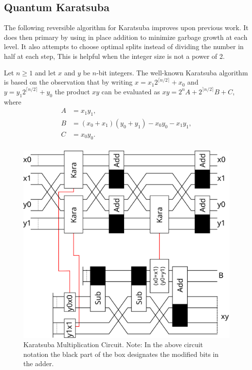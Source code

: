 \subsection{Quantum Karatsuba}
    The following reversible algorithm for Karatsuba improves upon previous work\cite{PF:2006}.
    It does then primary by using in place addition to minimize garbage growth at each level.
    It also attempts to choose optimal splits instead of dividing the number in half at each step,
    This is helpful when the integer size is not a power of 2.
    
    Let $n\geq 1$ and let $x$ and $y$ be $n$-bit integers. 
    The well-known Karatsuba\cite{KO:1963} algorithm is based on the observation that by writing $x=x_1 2^{\lceil n/2\rceil}+x_0$ and $y=y_1 2^{\lceil n/2\rceil }+y_0$ the product $xy$ can be evaluated as $xy=2^n A + 2^{\rceil n/2 \rceil} B + C$, where 
    \begin{align*}
      A &= x_1 y_1, \\
      B &= (x_0+x_1)(y_0+y_1) - x_0 y_0 - x_1 y_1,\\
      C &= x_0 y_0. \\
    \end{align*}
    \begin{figure}[ht]
      \capstart
      \centering
      \includegraphics[width=2\textwidth/3]{images/karatsuba2} 
      \caption{Karatsuba Multiplication Circuit.
               Note: In the above circuit notation the black part of the box designates the modified bits in the adder.}
      \label{fig:kara2}
     \end{figure}
